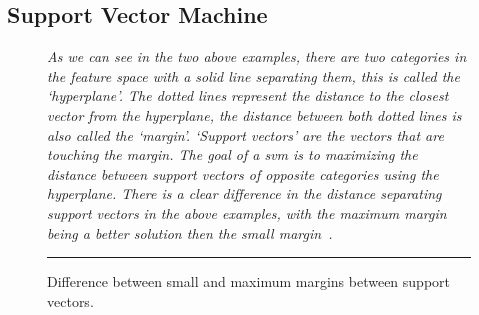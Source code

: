 \subsection{Support Vector Machine}
\label{subsec:background_support_vector_machine}
\begin{figure}[!tb]
  \centering
  \qquad
  \caption{Difference between small and maximum margins between support vectors.}
  \vspace{1mm}
  \footnotesize{\emph{As we can see in the two above examples, there are two categories in the feature space with a solid line separating them, this is called the `hyperplane'. The dotted lines represent the distance to the closest vector from the hyperplane, the distance between both dotted lines is also called the `margin'. `Support vectors' are the vectors that are touching the margin. The goal of a \gls{svm} is to maximizing the distance between support vectors of opposite categories using the hyperplane. There is a clear difference in the distance separating support vectors in the above examples, with the maximum margin~ being a better solution then the small margin~.}}
  \vspace{2mm}
  \hrule
  \label{fig:SVM_margin}
\end{figure}

